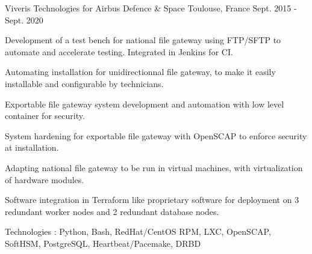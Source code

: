 \begin{cventries}
  {Viveris Technologies for Airbus Defence \& Space}
  {Toulouse, France}
  {Sept. 2015 - Sept. 2020}
  {
  \begin{cvitems}
    \item {Development of a test bench for national file gateway using FTP/SFTP to automate and accelerate testing. Integrated in Jenkins for CI.}
    \item {Automating installation for unidirectionnal file gateway, to make it easily installable and configurable by technicians.}
    \item {Exportable file gateway system development and automation with low level container for security.}
    \item {System hardening for exportable file gateway with OpenSCAP to enforce security at installation.}
    \item {Adapting national file gateway to be run in virtual machines, with virtualization of hardware modules.}
    \item {Software integration in Terraform like proprietary software for deployment on 3 redundant worker nodes and 2 redundant database nodes.}
    \item {Technologies : Python, Bash, RedHat/CentOS RPM, LXC, OpenSCAP, SoftHSM, PostgreSQL, Heartbeat/Pacemake, DRBD}
  \end{cvitems}
  }
\end{cventries}
